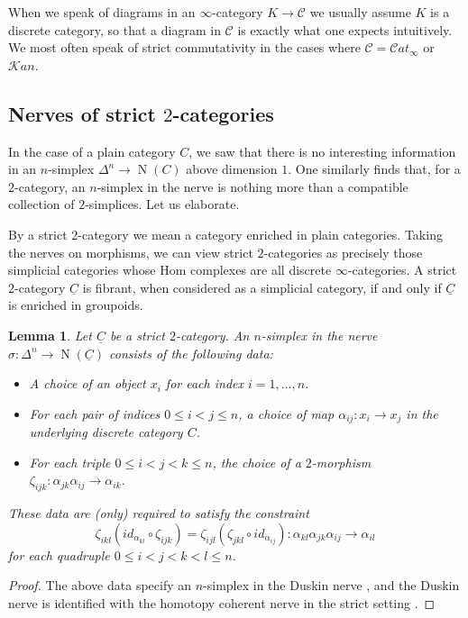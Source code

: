 \documentclass[reqno]{amsart}
\newtheorem{lemma}{Lemma}[section]
\theoremstyle{definition}
\newcommand{\msc}[1]{\mathscr{#1}}
\newcommand{\opn}[1]{\operatorname{#1}}
\newcommand{\sKan}{\msc{K}\!an}
\newcommand{\sCat}{\msc{C}\!at}
\renewcommand{\1}{\mathbf{1}}
\begin{document}
When we speak of diagrams in an $\infty$-category $K\to \msc{C}$ we usually assume $K$ is a discrete category, so that a diagram in $\msc{C}$ is exactly what one expects intuitively. We most often speak of strict commutativity in the cases where $\msc{C}=\sCat_{\infty}$ or $\sKan$.


\subsection{Nerves of strict $2$-categories}

In the case of a plain category $C$, we saw that there is no interesting information in an $n$-simplex $\Delta^n\to \opn{N}(C)$ above dimension $1$.  One similarly finds that, for a $2$-category, an $n$-simplex in the nerve is nothing more than a compatible collection of $2$-simplices.  Let us elaborate.

By a strict $2$-category we mean a category enriched in plain categories.  Taking the nerves on morphisms, we can view strict $2$-categories as precisely those simplicial categories whose Hom complexes are all discrete $\infty$-categories.  A strict $2$-category $\underline{C}$ is fibrant, when considered as a simplicial category, if and only if $\underline{C}$ is enriched in groupoids.

\begin{lemma}\label{lem:2cat}
Let $\underline{C}$ be a strict $2$-category.  An $n$-simplex in the nerve $\sigma:\Delta^n\to \opn{N}(\underline{C})$ consists of the following data:
\begin{itemize}
	\item A choice of an object $x_i$ for each index $i=1,\dots,n$.\vspace{1mm}
	\item For each pair of indices $0\leq i<j\leq n$, a choice of map $\alpha_{ij}:x_i\to x_j$ in the underlying discrete category $C$.\vspace{1mm}
	\item For each triple $0\leq i<j<k\leq n$, the choice of a $2$-morphism $\zeta_{ijk}:\alpha_{jk}\alpha_{ij}\to \alpha_{ik}$.
\end{itemize}
These data are (only) required to satisfy the constraint
\[
\zeta_{ikl}(id_{\alpha_{kl}}\circ \zeta_{ijk})=\zeta_{ijl}(\zeta_{jkl}\circ id_{\alpha_{ij}}):\alpha_{kl}\alpha_{jk}\alpha_{ij}\to \alpha_{il}
\]
for each quadruple $0\leq i<j<k<l\leq n$.
\end{lemma}

\begin{proof}
The above data specify an $n$-simplex in the Duskin nerve \cite[\href{https://kerodon.net/tag/009T}{009T}]{kerodon}, and the Duskin nerve is identified with the homotopy coherent nerve in the strict setting \cite[\href{https://kerodon.net/tag/00KY}{00KY}]{kerodon}.
\end{proof}
\end{document}
